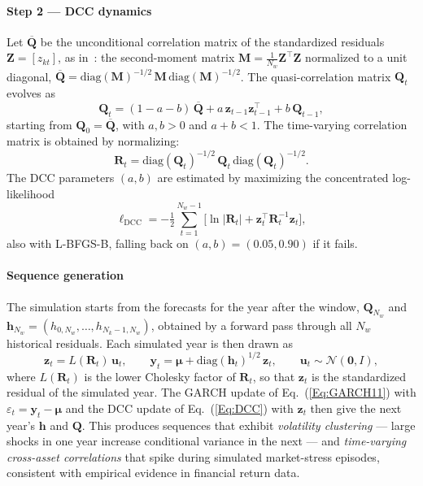 \documentclass[fleqn,12pt]{report}
\begin{document}
\paragraph*{Step 2 --- DCC dynamics}
Let $\overline{\mathbf{Q}}$ be the unconditional correlation matrix of the standardized
residuals $\mathbf{Z} = [z_{kt}]$, as in~\cite{engle2002}: the second-moment matrix
$\mathbf{M} = \frac{1}{N_w}\mathbf{Z}^\top\mathbf{Z}$ normalized to a unit diagonal,
$\overline{\mathbf{Q}} = \mathrm{diag}(\mathbf{M})^{-1/2}\,\mathbf{M}\,\mathrm{diag}(\mathbf{M})^{-1/2}$.
The quasi-correlation matrix $\mathbf{Q}_t$ evolves as
\begin{equation}
    \label{Eq:DCC}
    \mathbf{Q}_t = (1 - a - b)\,\overline{\mathbf{Q}}
                  + a\,\bm{z}_{t-1}\bm{z}_{t-1}^\top
                  + b\,\mathbf{Q}_{t-1},
\end{equation}
starting from $\mathbf{Q}_0 = \overline{\mathbf{Q}}$,
with $a, b > 0$ and $a + b < 1$.  The time-varying correlation matrix
is obtained by normalizing:
\begin{equation}
    \mathbf{R}_t = \mathrm{diag}(\mathbf{Q}_t)^{-1/2}\,
                  \mathbf{Q}_t\,
                  \mathrm{diag}(\mathbf{Q}_t)^{-1/2}.
\end{equation}
The DCC parameters $(a, b)$ are estimated by maximizing the
concentrated log-likelihood
\begin{equation}
    \ell_{\mathrm{DCC}} = -\tfrac{1}{2}\sum_{t=1}^{N_w-1}
    \bigl[\ln|\mathbf{R}_t| + \bm{z}_t^\top\mathbf{R}_t^{-1}\bm{z}_t\bigr],
\end{equation}
also with L-BFGS-B, falling back on $(a, b) = (0.05, 0.90)$ if it fails.

\paragraph*{Sequence generation}
The simulation starts from the forecasts for the year after the window,
$\mathbf{Q}_{N_w}$ and $\bm{h}_{N_w} = (h_{0,N_w},\ldots,h_{N_k-1,N_w})$,
obtained by a forward pass through all $N_w$ historical residuals.
Each simulated year is then drawn as
\begin{equation}
    \bm{z}_t = L(\mathbf{R}_t)\,\bm{u}_t, \qquad
    \bm{y}_t = \bm{\mu} + \mathrm{diag}(\bm{h}_t)^{1/2}\,\bm{z}_t,
    \qquad \bm{u}_t \sim \mathcal{N}(\mathbf{0}, I),
\end{equation}
where $L(\mathbf{R}_t)$ is the lower Cholesky factor of $\mathbf{R}_t$, so that $\bm{z}_t$ is
the standardized residual of the simulated year.
The GARCH update of Eq.~(\ref{Eq:GARCH11}) with $\varepsilon_t = \bm{y}_t - \bm{\mu}$ and the
DCC update of Eq.~(\ref{Eq:DCC}) with $\bm{z}_t$ then give the next year's $\bm{h}$ and $\mathbf{Q}$.
This produces sequences that exhibit \emph{volatility clustering} ---
large shocks in one year increase conditional variance in the next ---
and \emph{time-varying cross-asset correlations} that spike during
simulated market-stress episodes, consistent with empirical evidence
in financial return data.
\end{document}
